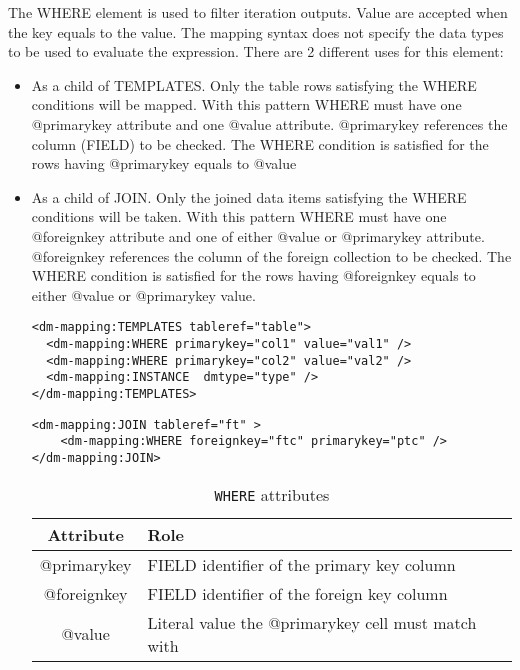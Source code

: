 The WHERE element is used to filter iteration outputs. Value are accepted when the key equals to the value. The mapping syntax does not specify the data types to be used to evaluate the expression. 
There  are 2 different uses for this element:
\begin{itemize}
    \item As a child of TEMPLATES. Only the table rows satisfying the WHERE conditions will be mapped. 
             With this pattern WHERE must have one @primarykey attribute and one @value attribute. 
              @primarykey references the column (FIELD) to be checked. 
             The WHERE condition is satisfied for the rows having @primarykey equals to @value
    \item As a child of JOIN. Only the joined data items satisfying the WHERE conditions will be taken. 
             With this pattern WHERE must have one @foreignkey attribute and one of either @value or @primarykey attribute. 
              @foreignkey references the column of the foreign collection to be checked. 
             The WHERE condition is satisfied for the rows having @foreignkey equals to either @value or @primarykey value.

\begin{lstlisting}[frame=single,caption={\texttt{WHERE} Example: only rows having val1 as col1 value and  val2 as col2 value are mapped},style=XML,basicstyle=\tiny]
<dm-mapping:TEMPLATES tableref="table">
  <dm-mapping:WHERE primarykey="col1" value="val1" />
  <dm-mapping:WHERE primarykey="col2" value="val2" />
  <dm-mapping:INSTANCE  dmtype="type" />
</dm-mapping:TEMPLATES>
\end{lstlisting}

\begin{lstlisting}[frame=single,caption={\texttt{WHERE} Example: the join is satisfied when the value of the ptc column  is equals to the ftc column of the foreign table },style=XML,basicstyle=\tiny]
<dm-mapping:JOIN tableref="ft" >
	<dm-mapping:WHERE foreignkey="ftc" primarykey="ptc" />
</dm-mapping:JOIN>
\end{lstlisting}

\begin{table}[!htbp]
\small
\centering
\begin{tabulary}{\linewidth}{|c|J|}       
       \hline 
            \textbf{Attribute} & 
            \textbf {Role}\\
       \hline         \hline  
            @primarykey& 
            FIELD identifier of the primary key column \\
        \hline 
            @foreignkey & 
            FIELD identifier of the foreign key column \\
        \hline 
            @value & 
            Literal value the  @primarykey cell must match with\\
        \hline 
     \end{tabulary}
     \caption{\texttt{WHERE} attributes} 
     \label{tbl:where-att}
 \end{table}


\end{itemize}

